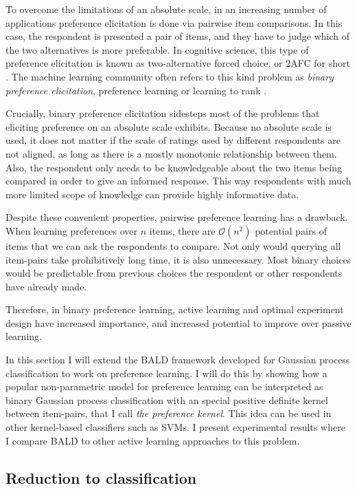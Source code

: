 To overcome the limitations of an absolute scale, in an increasing number of applications preference elicitation is done via pairwise item comparisons. In this case, the respondent is presented a pair of items, and they have to judge which of the two alternatives is more preferable. In cognitive science, this type of preference elicitation is known as two-alternative forced choice, or 2AFC for short \citep{Fechner1860,Platt1999}. The machine learning community often refers to this kind problem as \emph{binary preference elicitation}, preference learning or learning to rank \citep{Chu2005,furnkranz2010}.

Crucially, binary preference elicitation sidesteps most of the problems that eliciting preference on an absolute scale exhibits. Because no absolute scale is used, it does not matter if the scale of ratings used by different respondents are not aligned, as long as there is a mostly monotonic relationship between them. Also, the respondent only needs to be knowledgeable about the two items being compared in order to give an informed response. This way respondents with much more limited scope of knowledge can provide highly informative data.

Despite these convenient properties, pairwise preference learning has a drawback. When learning preferences over $n$ items, there are $\mathcal{O}(n^2)$ potential pairs of items that we can ask the respondents to compare. Not only would querying all item-pairs take prohibitively long time, it is also unnecessary. Most binary choices would be predictable from previous choices the respondent or other respondents have already made.

Therefore, in binary preference learning, active learning and optimal experiment design have increased importance, and increased potential to improve over passive learning.

In this section I will extend the BALD framework developed for Gaussian process classification to work on preference learning. I will do this by showing how a popular non-parametric model for preference learning can be interpreted as binary Gaussian process classification with an special positive definite kernel between item-pairs, that I call \emph{the preference kernel}. This idea can be used in other kernel-based classifiers such as SVMs. I present experimental results where I compare BALD to other active learning approaches to this problem.

\subsection{Reduction to classification\label{sec:prefKernel}}

